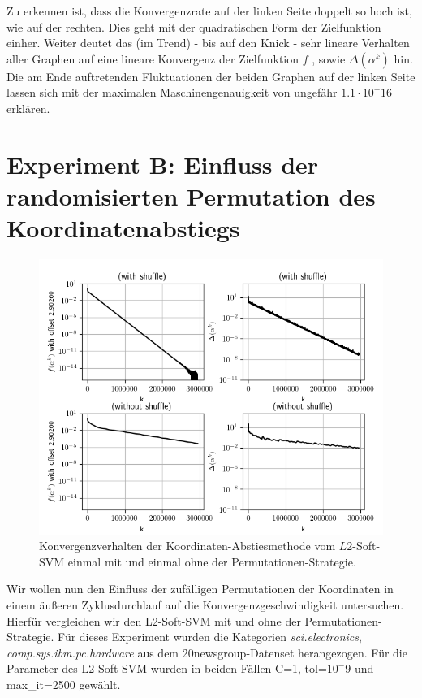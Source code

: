 Zu erkennen ist, dass die Konvergenzrate auf der linken Seite doppelt so hoch ist, wie auf der rechten. Dies geht mit der quadratischen Form der Zielfunktion einher. Weiter deutet das (im Trend) - bis auf den Knick - sehr lineare Verhalten aller Graphen auf eine lineare Konvergenz der Zielfunktion $f$ , sowie $\Delta(\alpha^k)$ hin. Die am Ende auftretenden Fluktuationen der beiden Graphen auf der linken Seite lassen sich mit der maximalen Maschinengenauigkeit von ungefähr $1.1 \cdot 10^-{16}$ erklären.

\section{Experiment B: Einfluss der randomisierten Permutation des Koordinatenabstiegs}
\begin{figure}[htbp]
	\centering
	\includegraphics[scale=0.5]{abbildungen/exp-b.png}
	\caption{Konvergenzverhalten der Koordinaten-Abstiesmethode vom $L2$-Soft-SVM einmal mit und einmal ohne der Permutationen-Strategie.}
	\label{img:exp-b}
\end{figure}
Wir wollen nun den Einfluss der zufälligen Permutationen der Koordinaten in einem äußeren Zyklusdurchlauf auf die Konvergenzgeschwindigkeit untersuchen. Hierfür vergleichen wir den L2-Soft-SVM mit und ohne der Permutationen-Strategie. Für dieses Experiment wurden die Kategorien \emph{sci.electronics}, \emph{comp.sys.ibm.pc.hardware} aus dem 20newsgroup-Datenset herangezogen. Für die Parameter des L2-Soft-SVM wurden in beiden Fällen C=1, tol=$10^-9$ und max\_it=2500 gewählt.

